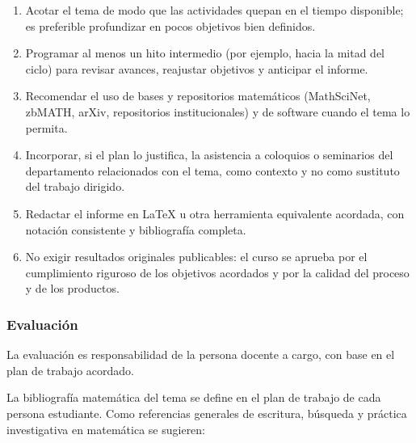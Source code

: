 \begin{refsection}
\begin{enumerate}
    \item Acotar el tema de modo que las actividades quepan en el tiempo disponible; es preferible profundizar en pocos objetivos bien definidos.
    \item Programar al menos un hito intermedio (por ejemplo, hacia la mitad del ciclo) para revisar avances, reajustar objetivos y anticipar el informe.
    \item Recomendar el uso de bases y repositorios matemáticos (MathSciNet, zbMATH, arXiv, repositorios institucionales) y de software cuando el tema lo permita.
    \item Incorporar, si el plan lo justifica, la asistencia a coloquios o seminarios del departamento relacionados con el tema, como contexto y no como sustituto del trabajo dirigido.
    \item Redactar el informe en \LaTeX{} u otra herramienta equivalente acordada, con notación consistente y bibliografía completa.
    \item No exigir resultados originales publicables: el curso se aprueba por el cumplimiento riguroso de los objetivos acordados y por la calidad del proceso y de los productos.
\end{enumerate}

\subsubsection*{Evaluación}

La evaluación es responsabilidad de la persona docente a cargo, con base en el plan de trabajo acordado.

La bibliografía matemática del tema se define en el plan de trabajo de cada persona estudiante. Como referencias generales de escritura, búsqueda y práctica investigativa en matemática se sugieren:

\nocite{Hig98}
\nocite{KLR89}
\nocite{Kra17}
\nocite{SHSD73}
\nocite{MathSciNet}
\nocite{AMS-authors}

\printcursosbibliography

\end{refsection}
